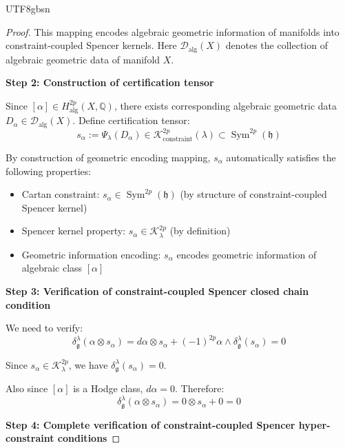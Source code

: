 \documentclass[a4paper,12pt]{extarticle}
\theoremstyle{definition}
\begin{document}
\begin{CJK}{UTF8}{gbsn}
\begin{proof}
This mapping encodes algebraic geometric information of manifolds into constraint-coupled Spencer kernels. Here $\mathcal{D}_{\text{alg}}(X)$ denotes the collection of algebraic geometric data of manifold $X$.

\textbf{Step 2: Construction of certification tensor}

Since $[\alpha] \in H_{\text{alg}}^{2p}(X, \mathbb{Q})$, there exists corresponding algebraic geometric data $D_\alpha \in \mathcal{D}_{\text{alg}}(X)$. Define certification tensor:
\begin{equation}
\label{eq:certification_tensor}
s_\alpha := \Psi_\lambda(D_\alpha) \in \mathcal{K}^{2p}_{\text{constraint}}(\lambda) \subset \operatorname{Sym}^{2p}(\mathfrak{h})
\end{equation}

By construction of geometric encoding mapping, $s_\alpha$ automatically satisfies the following properties:
\begin{itemize}
    \item Cartan constraint: $s_\alpha \in \operatorname{Sym}^{2p}(\mathfrak{h})$ (by structure of constraint-coupled Spencer kernel)
    \item Spencer kernel property: $s_\alpha \in \mathcal{K}^{2p}_\lambda$ (by definition)
    \item Geometric information encoding: $s_\alpha$ encodes geometric information of algebraic class $[\alpha]$
\end{itemize}

\textbf{Step 3: Verification of constraint-coupled Spencer closed chain condition}

We need to verify:
\begin{equation}
\label{eq:constraint_closed_verification}
\delta^\lambda_\mathfrak{g}(\alpha \otimes s_\alpha) = d\alpha \otimes s_\alpha + (-1)^{2p} \alpha \wedge \delta^\lambda_\mathfrak{g}(s_\alpha) = 0
\end{equation}

Since $s_\alpha \in \mathcal{K}^{2p}_\lambda$, we have $\delta^\lambda_\mathfrak{g}(s_\alpha) = 0$.

Also since $[\alpha]$ is a Hodge class, $d\alpha = 0$. Therefore:
\begin{equation}
\label{eq:constraint_closed_satisfied}
\delta^\lambda_\mathfrak{g}(\alpha \otimes s_\alpha) = 0 \otimes s_\alpha + 0 = 0
\end{equation}

\textbf{Step 4: Complete verification of constraint-coupled Spencer hyper-constraint conditions}


\end{proof}
\end{CJK}
\end{document}
